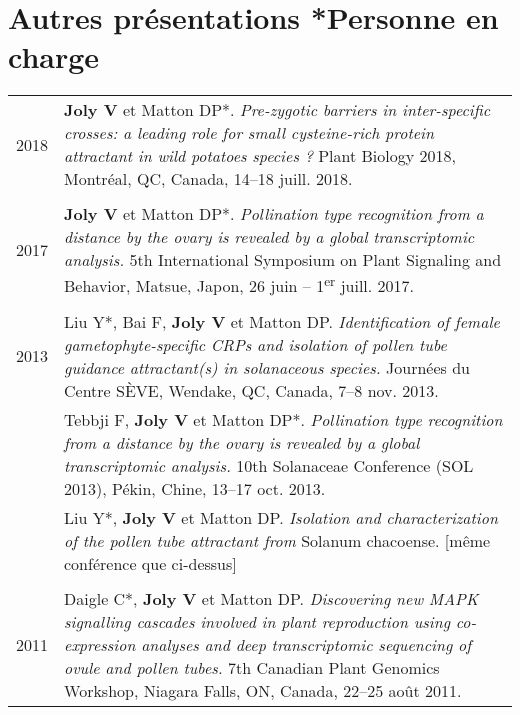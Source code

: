 \documentclass[letterpaper,12pt]{article}
\begin{document}
\vspace{6mm}

\section[Autres présentations]{Autres présentations
                               \hfill \small{*Personne en charge}}

\begin{tabularx}{\textwidth}{@{}r|X@{}}

2018

& \textbf{Joly V} et Matton DP*.
  \emph{Pre-zygotic barriers in inter-specific crosses: a leading role for small
  cysteine-rich protein attractant in wild potatoes species ?}
  Plant Biology 2018, Montréal, QC, Canada, 14--18 juill. 2018.
  \\

\multicolumn{2}{c}{} \\

2017

& \textbf{Joly V} et Matton DP*.
  \emph{Pollination type recognition from a distance by the ovary is revealed
  by a global transcriptomic analysis.}
  5th International Symposium on Plant Signaling and Behavior, Matsue, Japon,
  26 juin -- 1\textsuperscript{er} juill. 2017.
  \\

\multicolumn{2}{c}{} \\

2013

& Liu Y*, Bai F, \textbf{Joly V} et Matton DP.
  \emph{Identification of female gametophyte-specific CRPs and isolation of
  pollen tube guidance attractant(s) in solanaceous species.}
  Journées du Centre SÈVE, Wendake, QC, Canada, 7--8 nov. 2013.
  \vspace{1.5mm} \\

& Tebbji F, \textbf{Joly V} et Matton DP*. \emph{Pollination type recognition
  from a distance by the ovary is revealed by a global transcriptomic analysis.}
  10th Solanaceae Conference (SOL 2013), Pékin, Chine, 13--17 oct. 2013.
  \vspace{1.5mm} \\

& Liu Y*, \textbf{Joly V} et Matton DP.
  \emph{Isolation and characterization of the pollen tube attractant from}
  Solanum chacoense. [même conférence que ci-dessus] \\

\multicolumn{2}{c}{} \\

2011

& Daigle C*, \textbf{Joly V} et Matton DP.
  \emph{Discovering new MAPK signalling cascades involved in plant reproduction
  using co-expression analyses and deep transcriptomic sequencing of ovule
  and pollen tubes.}
  7th Canadian Plant Genomics Workshop, Niagara Falls, ON, Canada,
  22--25 août 2011.
  \\

\end{tabularx}
\end{document}
